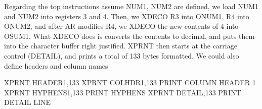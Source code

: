 \documentclass{report}
\begin{document}
\begin{itemize}
                    \bigbreak \noindent 
                    Regarding the top instructions assume NUM1, NUM2 are defined, we load NUM1 and NUM2 into registers 3 and 4. Then, we XDECO R3 into ONUM1, R4 into ONUM2, and after AR modifies R4, we XDECO the new contents of 4 into OSUM1. What XDECO does is converts the contents to decimal, and puts them into the character buffer right justified.
                    \bigbreak \noindent 
                    XPRNT then starts at the carriage control (DETAIL), and prints a total of 133 bytes formatted.
                    \bigbreak \noindent 
                    We could also define headers and column names
                    \bigbreak \noindent 
                    \begin{cppcode}
                        XPRNT HEADER1,133 
                        XPRNT COLHDR1,133     PRINT COLUMN HEADER 1 
                        XPRNT HYPHENS1,133    PRINT HYPHENS 
                        XPRNT DETAIL,133      PRINT DETAIL LINE 


\end{cppcode}
\end{itemize}
\end{document}
